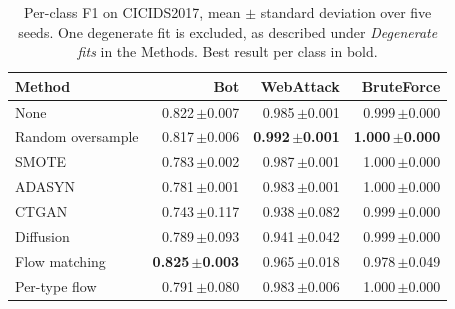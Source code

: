 \begin{table}[t]
\centering
\caption{Per-class F1 on CICIDS2017, mean $\pm$ standard deviation over five seeds. One degenerate fit is excluded, as described under \emph{Degenerate fits} in the Methods. Best result per class in bold.}
\label{tab:full_cicids}
\begin{tabular}{lrrr}
\toprule
Method & Bot & WebAttack & BruteForce \\
\midrule
None & 0.822\,\tiny{$\pm$0.007} & 0.985\,\tiny{$\pm$0.001} & 0.999\,\tiny{$\pm$0.000} \\
Random oversample & 0.817\,\tiny{$\pm$0.006} & \textbf{0.992\,\tiny{$\pm$0.001}} & \textbf{1.000\,\tiny{$\pm$0.000}} \\
SMOTE & 0.783\,\tiny{$\pm$0.002} & 0.987\,\tiny{$\pm$0.001} & 1.000\,\tiny{$\pm$0.000} \\
ADASYN & 0.781\,\tiny{$\pm$0.001} & 0.983\,\tiny{$\pm$0.001} & 1.000\,\tiny{$\pm$0.000} \\
\midrule
CTGAN & 0.743\,\tiny{$\pm$0.117} & 0.938\,\tiny{$\pm$0.082} & 0.999\,\tiny{$\pm$0.000} \\
Diffusion & 0.789\,\tiny{$\pm$0.093} & 0.941\,\tiny{$\pm$0.042} & 0.999\,\tiny{$\pm$0.000} \\
Flow matching & \textbf{0.825\,\tiny{$\pm$0.003}} & 0.965\,\tiny{$\pm$0.018} & 0.978\,\tiny{$\pm$0.049} \\
Per-type flow & 0.791\,\tiny{$\pm$0.080} & 0.983\,\tiny{$\pm$0.006} & 1.000\,\tiny{$\pm$0.000} \\
\bottomrule
\end{tabular}
\end{table}
